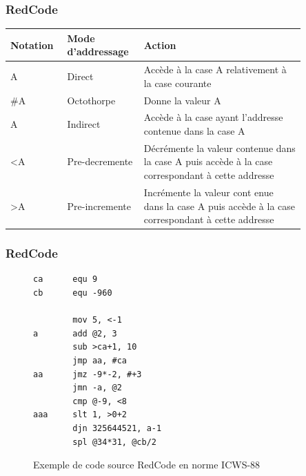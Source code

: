 \documentclass{beamer}
\begin{document}
\begin{frame}[fragile]
	\frametitle{RedCode}
	\begin{table}[h!]
		\begin{center}
			\begin{tabular}{p{0.15\linewidth}|p{0.2\linewidth}|p{0.5\linewidth}}
				\textbf{Notation} & \textbf{Mode d'addressage} & \textbf{Action} \\
				\hline
				A & Direct & Accède à la case A relativement à la case courante\\
				\hline
				\#A & Octothorpe & Donne la valeur A\\
				\hline
				\symbol{64}A & Indirect & Accède à la case ayant l'addresse contenue dans la case A\\
				\hline
				<A & Pre-decremente & Décrémente la valeur contenue dans la case A puis accède à la case correspondant à cette addresse\\
				\hline
				>A & Pre-incremente & Incrémente la valeur cont
enue dans la case A puis accède à la case correspondant à cette addresse\\
			\end{tabular}
		\end{center}
	\end{table}
\end{frame}

\begin{frame}[containsverbatim]
\frametitle{RedCode}
\begin{figure}
\begin{lstlisting}
ca      equ 9
cb      equ -960

        mov 5, <-1
a       add @2, 3
        sub >ca+1, 10
        jmp aa, #ca
aa      jmz -9*-2, #+3
        jmn -a, @2
        cmp @-9, <8
aaa     slt 1, >0+2
        djn 325644521, a-1
        spl @34*31, @cb/2
\end{lstlisting}
\caption{Exemple de code source RedCode en norme ICWS-88}
\end{figure}
\end{frame}
\end{document}
